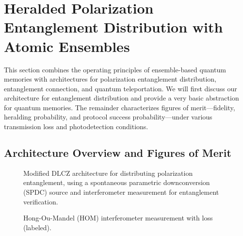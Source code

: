 \documentclass[aps,twocolumn,secnumarabic,amsmath,amssymb,pra,groupedaddress,
showpacs, showkeys,draft]{revtex4-1}
\newcommand{\ket}[1]{\left|#1\right\rangle}
\newcommand{\abs}[1]{\left|#1\right|}
\begin{document}

\section{Heralded Polarization Entanglement Distribution with Atomic
  Ensembles\label{chap:herald}}

This section combines the operating principles of ensemble-based quantum
memories with architectures for polarization entanglement distribution,
entanglement connection, and quantum teleportation. We will first discuss our
architecture for entanglement distribution and provide a very basic abstraction
for quantum memories. The remainder characterizes figures of merit---fidelity,
heralding probability, and protocol success probability---under various
transmission loss and photodetection conditions.

\subsection{Architecture Overview and Figures of Merit\label{sec:herald:overview}}

\begin{figure}[t]
	\centering
	\resizebox{6.50in}{!}{}
	\caption{Modified DLCZ architecture for distributing polarization entanglement, using a spontaneous parametric downconversion (SPDC) source and  interferometer measurement for entanglement verification.}
	\label{fig:channel_model}
\end{figure}

\begin{figure}[htb]
	\centering
	\resizebox{6.50in}{!}{}
	\caption{Hong-Ou-Mandel (HOM) interferometer measurement with loss (labeled).}
	\label{fig:channel_loss_model}
\end{figure}
\end{document}
